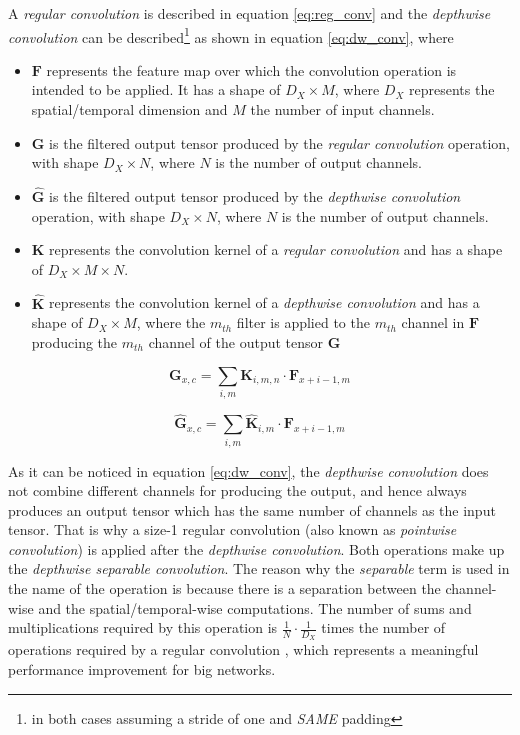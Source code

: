 \documentclass[review]{elsarticle}
\begin{document}
A \textit{regular convolution} \cite{Howard2017} is described in equation \ref{eq:reg_conv} and the \textit{depthwise convolution} \cite{Howard2017} can be described\footnote{in both cases assuming a stride of one and \textit{SAME} padding} as shown in equation \ref{eq:dw_conv}, where 

\begin{itemize}
	\item $\mathbf{F}$ represents the feature map over which the convolution operation is intended to be applied. It has a shape of $D_X \times M$, where $D_X$ represents the spatial/temporal dimension and $M$ the number of input channels.
	\item $\mathbf{G}$ is the filtered output tensor produced by the \textit{regular convolution} operation, with shape $D_X \times N$, where $N$ is the number of output channels.
	\item $\hat{\mathbf{G}}$ is the filtered output tensor produced by the \textit{depthwise convolution} operation, with shape $D_X \times N$, where $N$ is the number of output channels.
	\item $\mathbf{K}$ represents the convolution kernel of a \textit{regular convolution} and has a shape of $D_X \times M \times N$.
	\item $\hat{\mathbf{K}}$ represents the convolution kernel of a \textit{depthwise  convolution} and has a shape of $D_X \times M$, where the $m_{th}$ filter is applied to the $m_{th}$ channel in $\mathbf{F}$ producing the $m_{th}$ channel of the output tensor $\hat{\mathbf{G}}$
\end{itemize}


\begin{equation}
\mathbf{G}_{x, c} = \sum_{i, m} \mathbf{K}_{i, m, n} \cdot \mathbf{F}_{x+i-1, m}
\label{eq:reg_conv}
\end{equation}

\begin{equation}
\hat{\mathbf{G}}_{x, c} = \sum_{i, m} \hat{\mathbf{K}}_{i, m} \cdot \mathbf{F}_{x+i-1, m}
\label{eq:dw_conv}
\end{equation}

As it can be noticed in equation \ref{eq:dw_conv}, the \textit{depthwise convolution} does not combine different channels for producing the output, and hence always produces an output tensor which has the same number of channels as the input tensor. That is why a size-1 regular convolution (also known as \textit{pointwise convolution}) is applied after the \textit{depthwise convolution}. Both operations make up the \textit{depthwise separable convolution}. The reason why the \textit{separable} term is used in the name of the operation is because there is a separation between the channel-wise and the spatial/temporal-wise computations. The number of sums and multiplications required by this operation is $\frac{1}{N} \cdot \frac{1}{D_X}$ times the number of operations required by a regular convolution \cite{Howard2017}, which represents a meaningful performance improvement for big networks.
\end{document}
